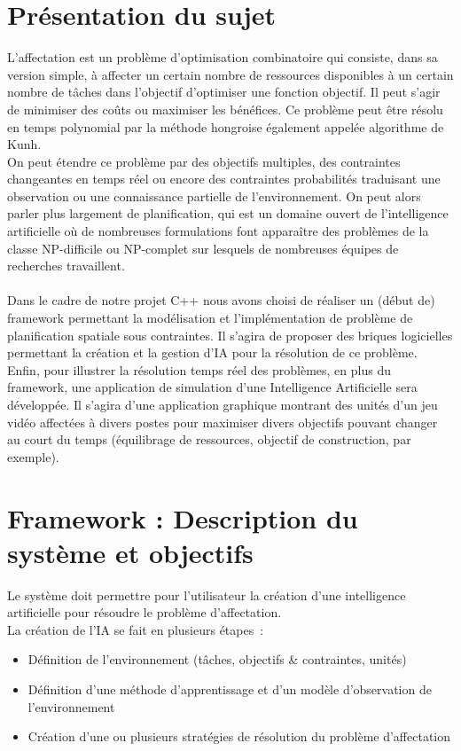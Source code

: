 
\section{Présentation du sujet}
L'affectation est un problème d’optimisation combinatoire qui consiste, dans sa version simple, à affecter un certain nombre de ressources disponibles à un certain nombre de tâches dans l'objectif d'optimiser une fonction objectif. Il peut s'agir de minimiser des coûts ou maximiser les bénéfices. Ce problème peut être résolu en temps polynomial par la méthode hongroise également appelée algorithme de Kunh.\\
On peut étendre ce problème par des objectifs multiples, des contraintes changeantes en temps réel ou encore des contraintes probabilités traduisant une observation ou une connaissance partielle de l'environnement. On peut alors parler plus largement de planification, qui est un domaine ouvert de l'intelligence artificielle où de nombreuses formulations font apparaître des problèmes de la classe NP-difficile ou NP-complet sur lesquels de nombreuses équipes de recherches travaillent.\\\\

Dans le cadre de notre projet C++ nous avons choisi de réaliser un (début de) framework permettant la modélisation et l'implémentation de problème de planification spatiale sous contraintes. Il s'agira de proposer des briques logicielles permettant la création et la gestion d'IA pour la résolution de ce problème.\\
Enfin, pour illustrer la résolution temps réel des problèmes, en plus du framework, une application de simulation d'une Intelligence Artificielle sera développée. Il s'agira d'une application graphique montrant des unités d'un jeu vidéo affectées à divers postes pour maximiser divers objectifs pouvant changer au court du temps (équilibrage de ressources, objectif de construction, par exemple).

\section{Framework : Description du système et objectifs}

Le système doit permettre pour l'utilisateur la création d'une intelligence artificielle pour résoudre le problème d'affectation.\\
La création de l'IA se fait en plusieurs étapes :
\begin{itemize}
\item Définition de l'environnement (tâches, objectifs & contraintes, unités)
\item Définition d'une méthode d'apprentissage et d'un modèle d'observation de l'environnement
\item Création d'une ou plusieurs stratégies de résolution du problème d'affectation
\end{itemize}

